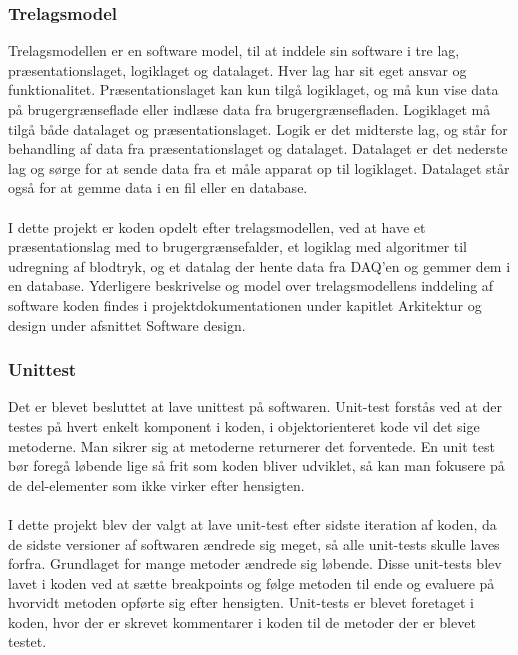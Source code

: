 \subsubsection{Trelagsmodel}
Trelagsmodellen er en software model, til at inddele sin software i tre lag, præsentationslaget, logiklaget og datalaget. Hver lag har sit eget ansvar og funktionalitet. Præsentationslaget kan kun tilgå logiklaget, og må kun vise data på brugergrænseflade eller indlæse data fra brugergrænsefladen. Logiklaget må tilgå både datalaget og præsentationslaget. Logik er det midterste lag, og står for behandling af data fra præsentationslaget og datalaget. Datalaget er det nederste lag og sørge for at sende data fra et måle apparat op til logiklaget. Datalaget står også for at gemme data i en fil eller en database.\\
\\ 
I dette projekt er koden opdelt efter trelagsmodellen, ved at have et præsentationslag med to brugergrænsefalder, et logiklag med algoritmer til udregning af blodtryk, og et datalag der hente data fra DAQ’en og gemmer dem i en database.  Yderligere beskrivelse og model over trelagsmodellens inddeling af software koden findes i projektdokumentationen under kapitlet Arkitektur og design under afsnittet Software design. 
\subsubsection{Unittest}
Det er blevet besluttet at lave unittest på softwaren. Unit-test forstås ved at der testes på hvert enkelt komponent i koden, i objektorienteret kode vil det sige metoderne. Man sikrer sig at metoderne returnerer det forventede. En unit test bør foregå løbende lige så frit som koden bliver udviklet, så kan man fokusere på de del-elementer som ikke virker efter hensigten. \\
\\
I dette projekt blev der valgt at lave unit-test efter sidste iteration af koden, da de sidste versioner af softwaren ændrede sig meget, så alle unit-tests skulle laves forfra. Grundlaget for mange metoder ændrede sig løbende. Disse unit-tests blev lavet i koden ved at sætte breakpoints og følge metoden til ende og evaluere på hvorvidt metoden opførte sig efter hensigten. Unit-tests er blevet foretaget i koden, hvor der er skrevet kommentarer i koden til de metoder der er blevet testet.
